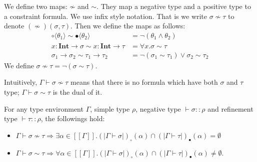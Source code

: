 \documentclass[runningheads]{llncs}
\newcommand {\val}[1]{[\![#1]\!]}
\newcommand \stypeint {\textbf{Int}}
\newcommand \stypebool {\bullet}
\newcommand \stypeboolf {\circ}
\newcommand \typeint[1]{{#1} : \stypeint}
\newcommand \typebool[1]{\stypebool \langle #1 \rangle}
\newcommand \typeboolf[1]{\stypeboolf \langle #1 \rangle}
\newcommand {\semt}[1]{(\!|#1|\!)_\bullet}
\newcommand {\semtf}[1]{(\!|#1|\!)_\circ}
\newcommand {\conflict}{\not \sim}
\newcommand {\consistent}{\sim}
\begin{document}
We define two maps: \( \conflict \) and \( \consistent \). They map a negative type and a positive type to a constraint formula. We use infix style notation. That is we write \( \sigma \conflict \tau \) to denote \( (\conflict)(\sigma, \tau) \).
Then we define the maps as follows:
\begin{align*}
    \typeboolf{\theta_1} \consistent \typebool{\theta_2}
        &= \lnot(\theta_1 \land \theta_2) \\
    \typeint{x} \to \sigma \consistent \typeint{x} \to \tau
        &= \forall x. \sigma \consistent \tau \\
    \sigma_1 \to \sigma_2 \consistent \tau_1 \to \tau_2
        &= \lnot(\sigma_1 \consistent \tau_1)
            \lor \sigma_2 \consistent \tau_2
\end{align*}
We define \( \sigma \conflict \tau = \lnot(\sigma \consistent \tau) \).

Intuitively, \( \Gamma \vdash \sigma \conflict \tau \) means that
there is no formula which have both \( \sigma \) and \( \tau \) type; \( \Gamma \vdash \sigma \consistent \tau \) is the dual of it.


\begin{lemma}
\label{lemma:conflict}
For any type environment \( \Gamma \), simple type \( \rho \), negative type \( \vdash \sigma :: \rho \) and refinement type \( \vdash \tau :: \rho \), the followings hold:
\begin{itemize}
    \item \( \Gamma \vdash \sigma \conflict \tau \Rightarrow
    \exists \alpha \in \val{\Gamma}.
    \semtf{\Gamma \vdash \sigma}(\alpha) \cap \semt{\Gamma \vdash \tau}(\alpha) = \emptyset \)

    \item \( \Gamma \vdash \sigma \consistent \tau \Rightarrow
    \forall \alpha \in \val{\Gamma}.
    \semtf{\Gamma \vdash \sigma}(\alpha) \cap \semt{\Gamma \vdash \tau}(\alpha) \neq \emptyset \).
\end{itemize}
\end{lemma}
\end{document}

